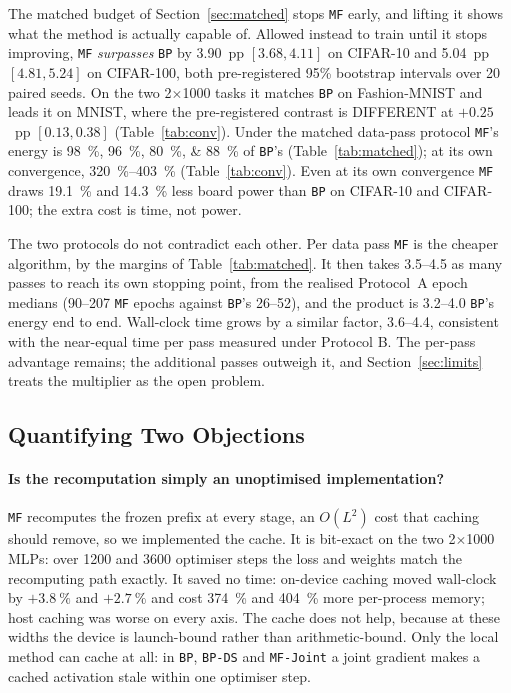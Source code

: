 \documentclass{llncs}
\newcommand{\MF}{\texttt{MF}}
\newcommand{\BP}{\texttt{BP}}
\newcommand{\BPDS}{\texttt{BP-DS}}
\newcommand{\MFJ}{\texttt{MF-Joint}}
\begin{document}
The matched budget of Section~\ref{sec:matched} stops \MF{} early, and lifting it shows
what the method is actually capable of. Allowed instead to train until it stops
improving, \MF{} \emph{surpasses} \BP{} by \num{3.90}~pp
$[\num{+3.68}, \num{+4.11}]$ on CIFAR-10 and \num{5.04}~pp
$[\num{+4.81}, \num{+5.24}]$ on CIFAR-100, both pre-registered \num{95}\%
bootstrap intervals over \num{20} paired seeds. On the two
\num{2}$\times$\num{1000} tasks it matches \BP{} on Fashion-MNIST and leads it
on MNIST, where the pre-registered contrast is DIFFERENT at $+\num{0.25}$~pp
$[\num{+0.13}, \num{+0.38}]$ (Table~\ref{tab:conv}). Under the matched
data-pass protocol \MF{}'s energy is \SIlist{98;96;80;88}{\percent} of \BP{}'s
(Table~\ref{tab:matched}); at its own convergence,
\SIrange{320}{403}{\percent} (Table~\ref{tab:conv}). Even at its own convergence \MF{} draws \SI{19.1}{\percent} and
\SI{14.3}{\percent} less board power than \BP{} on CIFAR-10 and CIFAR-100; the
extra cost is time, not power.

The two protocols do not contradict each other. Per data pass \MF{} is the cheaper algorithm, by the margins
of Table~\ref{tab:matched}. It then takes \SIrange{3.5}{4.5}{\times} as many
passes to reach its own stopping point, from the realised Protocol~A epoch
medians (\numrange{90}{207} \MF{} epochs against \BP{}'s
\numrange{26}{52}), and the product is
\SIrange{3.2}{4.0}{\times} \BP{}'s energy end to end. Wall-clock time grows by a similar factor,
\SIrange{3.6}{4.4}{\times}, consistent with the near-equal time per pass
measured under Protocol B. The per-pass advantage
remains; the additional passes outweigh it, and Section~\ref{sec:limits}
treats the multiplier as the open problem.


\subsection{Quantifying Two Objections}
\label{sec:objections}

\paragraph{Is the recomputation simply an unoptimised implementation?}
\MF{} recomputes the frozen prefix at every stage, an $O(L^2)$ cost that
caching should remove, so we implemented the cache. It is bit-exact on the two \num{2}$\times$\num{1000} MLPs: over \num{1200} and \num{3600} optimiser steps the loss
and weights match the recomputing path exactly. It saved no time: on-device caching moved wall-clock by
$+\SI{3.8}{\percent}$ and $+\SI{2.7}{\percent}$ and cost \SI{374}{\percent} and
\SI{404}{\percent} more per-process memory; host caching was worse on every
axis. The cache does not help, because at
these widths the device is launch-bound rather than arithmetic-bound. Only the
local method can cache at all: in \BP{}, \BPDS{} and \MFJ{} a joint gradient
makes a cached activation stale within one optimiser step.
\end{document}
